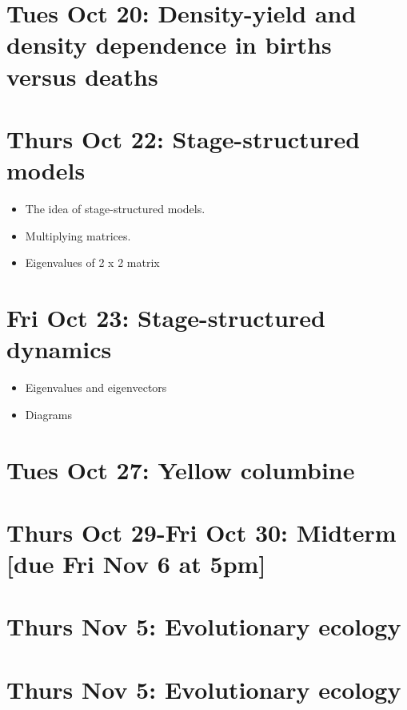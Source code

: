 \documentclass[]{book}
\providecommand{\tightlist}{%
  \setlength{\itemsep}{0pt}\setlength{\parskip}{0pt}}
\begin{document}
\chapter{Tues Oct 20: Density-yield and density dependence in births
versus
deaths}\label{tues-oct-20-density-yield-and-density-dependence-in-births-versus-deaths}

\chapter{Thurs Oct 22: Stage-structured
models}\label{thurs-oct-22-stage-structured-models}

\begin{itemize}
\tightlist
\item
  The idea of stage-structured models.
\item
  Multiplying matrices.
\item
  Eigenvalues of 2 x 2 matrix
\end{itemize}

\chapter{Fri Oct 23: Stage-structured
dynamics}\label{fri-oct-23-stage-structured-dynamics}

\begin{itemize}
\tightlist
\item
  Eigenvalues and eigenvectors
\item
  Diagrams
\end{itemize}

\chapter{Tues Oct 27: Yellow
columbine}\label{tues-oct-27-yellow-columbine}

\chapter{Thurs Oct 29-Fri Oct 30: Midterm {[}due Fri Nov 6 at
5pm{]}}\label{thurs-oct-29-fri-oct-30-midterm-due-fri-nov-6-at-5pm}

\chapter{Thurs Nov 5: Evolutionary
ecology}\label{thurs-nov-5-evolutionary-ecology}

\chapter{Thurs Nov 5: Evolutionary
ecology}\label{thurs-nov-5-evolutionary-ecology-1}
\end{document}
